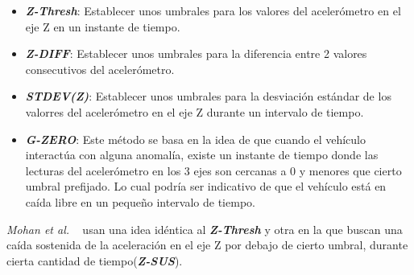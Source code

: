 		\begin{itemize}
			\item  \emph{\textbf {Z-Thresh}}: Establecer unos umbrales para los valores del acelerómetro en el eje Z en un instante de tiempo.\\
			\item \emph{\textbf {Z-DIFF}}: Establecer unos umbrales para la diferencia entre 2 valores consecutivos del acelerómetro.\\
			\item \emph{\textbf {STDEV(Z)}}: Establecer unos umbrales para la desviación estándar de los valorres del acelerómetro en
				el eje Z durante un intervalo de tiempo.\\ 
			\item \emph{\textbf {G-ZERO}}: Este método se basa en la idea de que cuando el vehículo interactúa con alguna anomalía, existe un
				instante de tiempo donde las lecturas del acelerómetro en los 3 ejes son cercanas a 0 y menores que cierto umbral prefijado. Lo 
				cual podría ser indicativo de que el vehículo está en caída libre en un pequeño intervalo de tiempo.
		\end{itemize}

		\emph{Mohan et al.} ~ usan una idea idéntica al \emph{\textbf{Z-Thresh}} y otra en la que buscan
		una caída sostenida de la aceleración en el eje Z por debajo de cierto umbral, durante cierta cantidad de tiempo(\emph{\textbf{Z-SUS}}).\\



